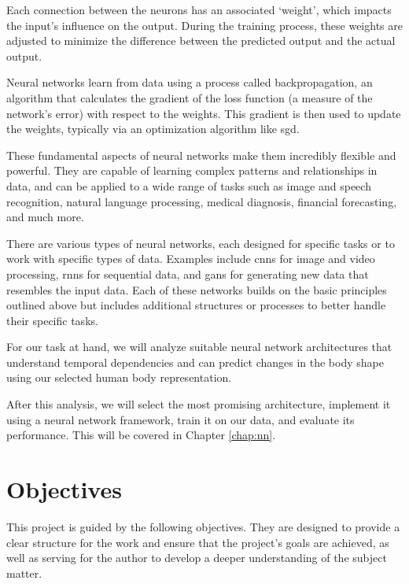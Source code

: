 Each connection between the neurons has an associated `weight', which impacts
the input's influence on the output. During the training process, these weights
are adjusted to minimize the difference between the predicted output and the
actual output.

Neural networks learn from data using a process called backpropagation, an
algorithm that calculates the gradient of the loss function (a measure of the
network's error) with respect to the weights. This gradient is then used to
update the weights, typically via an optimization algorithm like \gls{sgd}.

These fundamental aspects of neural networks make them incredibly flexible and
powerful. They are capable of learning complex patterns and relationships in
data, and can be applied to a wide range of tasks such as image and speech
recognition, natural language processing, medical diagnosis, financial
forecasting, and much more.

There are various types of neural networks, each designed for specific tasks or
to work with specific types of data. Examples include \glspl{cnn} for image and
video processing, \glspl{rnn} for sequential data, and \glspl{gan} for
generating new data that resembles the input data. Each of these networks
builds on the basic principles outlined above but includes additional
structures or processes to better handle their specific tasks.

For our task at hand, we will analyze suitable neural network architectures
that understand temporal dependencies and can predict changes in the body shape
using our selected human body representation.

After this analysis, we will select the most promising architecture, implement
it using a neural network framework, train it on our data, and evaluate its
performance. This will be covered in Chapter \ref{chap:nn}.

\section{Objectives}\label{objectives}

This project is guided by the following objectives. They are designed to
provide a clear structure for the work and ensure that the project's goals are
achieved, as well as serving for the author to develop a deeper understanding
of the subject matter.

